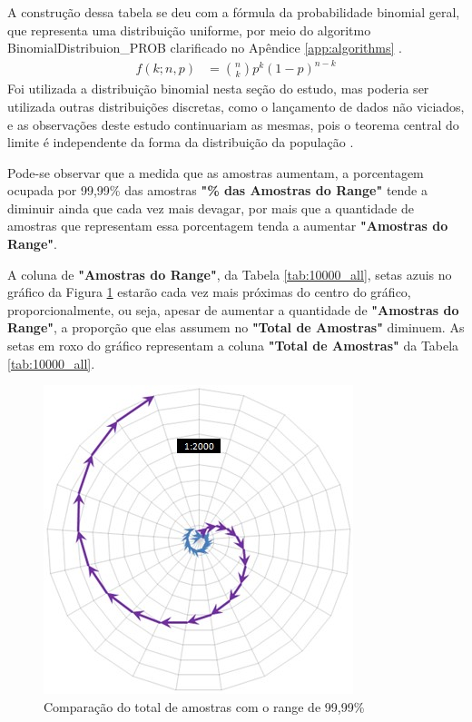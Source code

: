 A construção dessa tabela se deu com a fórmula da probabilidade binomial geral, que representa uma distribuição uniforme, por meio do algoritmo BinomialDistribuion\_PROB clarificado no Apêndice \ref{app:algorithms} \cite{mathisfun_binomial_distribution}.
	\begin{align*}
	f(k;n,p) &= \binom{n}{k} p^k(1 - p)^{n-k}
	\end{align*}
Foi utilizada a distribuição binomial nesta seção do estudo, mas poderia ser utilizada outras distribuições discretas, como o lançamento de dados não viciados, e as observações deste estudo continuariam as mesmas, pois o teorema central do limite é independente da forma da distribuição da população \cite{statisticsbyjim_central_limit_theorem_explainded}.

Pode-se observar que a medida que as amostras aumentam, a porcentagem ocupada por 99,99\% das amostras \textbf{"\% das Amostras do Range"} tende a diminuir ainda que cada vez mais devagar, por mais que a quantidade de amostras que representam essa porcentagem tenda a aumentar \textbf{"Amostras do Range"}.

A coluna de \textbf{"Amostras do Range"}, da Tabela \ref{tab:10000_all}, setas azuis no gráfico da Figura \ref{fig:total_comparison_chart_with_99_range} estarão cada vez mais próximas do centro do gráfico, proporcionalmente, ou seja, apesar de aumentar a quantidade de \textbf{"Amostras do Range"}, a proporção que elas assumem no \textbf{"Total de Amostras"}  diminuem. As setas em roxo do gráfico representam a coluna \textbf{"Total de Amostras"} da Tabela \ref{tab:10000_all}. 
	\begin{figure}[H]
	\caption{Comparação do total de amostras com o range de 99,99\% }
	\label{fig:total_comparison_chart_with_99_range}
	\centering
	\includegraphics[scale=.9]{sections/images/total_comparison_chart_with_99_range.jpg}
	\end{figure}

